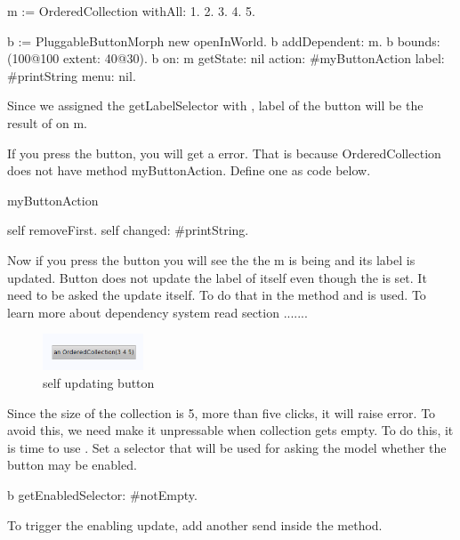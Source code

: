 \documentclass[a4paper,10pt,twoside]{book}
\begin{document}
\begin{code}{}
m := OrderedCollection withAll: {1. 2. 3. 4. 5}.

b := PluggableButtonMorph new openInWorld.
b addDependent: m.  
b bounds: (100@100 extent: 40@30).
b on: m getState: nil action: #myButtonAction label: #printString menu: nil.
\end{code}

Since we assigned the getLabelSelector with , label of the button will be the result of  on m.

If you press the button, you will get a  error. That is because OrderedCollection does not have method myButtonAction. Define one as code below.

\begin{code}{}
myButtonAction

	self removeFirst.
	self changed: #printString.
\end{code}

Now if you press the button you will see the the m is being  and its label is updated. Button does not update the label of itself even though the  is set. It need to be asked the update itself. To do that  in the  method and  is used. To learn more about dependency system read section ....... 

\begin{figure}[htbp]
\begin{center}
	\includegraphics[width=3.0cm]{UpdatingButton}
	\caption{self updating button}
\end{center}
\end{figure}

Since the size of the collection is 5, more than five clicks, it will raise error. To avoid this, we need make it unpressable when collection gets empty. To do this, it is time to use . Set a selector that will be used for asking the model whether the button may be enabled. 

\begin{code}{}
b getEnabledSelector: #notEmpty.  
\end{code}

To trigger the enabling update, add another  send inside the  method.
\end{document}
